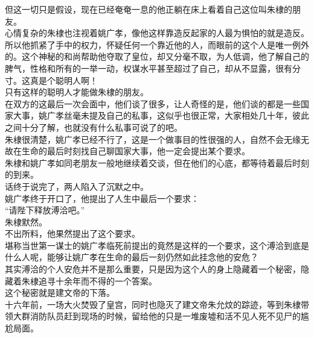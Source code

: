 \begin{multicols}{\theparacolNo}
但这一切只是假设，现在已经奄奄一息的他正躺在床上看着自己这位叫朱棣的朋友。\\

心情复杂的朱棣也注视着姚广孝，像他这样靠造反起家的人最为惧怕的就是造反。所以他抓紧了手中的权力，怀疑任何一个靠近他的人，而眼前的这个人是唯一例外的。这个神秘的和尚帮助他夺取了皇位，却又分毫不取，为人低调，他了解自己的脾气，性格和所有的一举一动，权谋水平甚至超过了自己，却从不显露，很有分寸。这真是个聪明人啊！\\

只有这样的聪明人才能做朱棣的朋友。\\

在双方的这最后一次会面中，他们谈了很多，让人奇怪的是，他们谈的都是一些国家大事，姚广孝丝毫未提及自己的私事，这似乎也很正常，大家相处几十年，彼此之间十分了解，也就没有什么私事可说了的吧。\\

朱棣很清楚，姚广孝已经不行了，这是一个做事目的性很强的人，自然不会无缘无故在生命的最后时刻找自己聊国家大事，他一定会提出某个要求。\\

朱棣和姚广孝如同老朋友一般地继续着交谈，但在他们的心底，都等待着最后时刻的到来。\\

话终于说完了，两人陷入了沉默之中。\\

姚广孝终于开口了，他提出了人生中最后一个要求：\\

“请陛下释放溥洽吧。”\\

朱棣默然。\\

不出所料，他果然提出了这个要求。\\

堪称当世第一谋士的姚广孝临死前提出的竟然是这样的一个要求，这个溥洽到底是什么人呢，能够让姚广孝在生命的最后一刻仍然如此挂念他的安危？\\

其实溥洽的个人安危并不是那么重要，只是因为这个人的身上隐藏着一个秘密，隐藏着朱棣追寻十余年而不得的一个答案。\\

这个秘密就是建文帝的下落。\\

十六年前，一场大火焚毁了皇宫，同时也隐灭了建文帝朱允炆的踪迹，等到朱棣带领大群消防队员赶到现场的时候，留给他的只是一堆废墟和活不见人死不见尸的尴尬局面。\\


\end{multicols}
